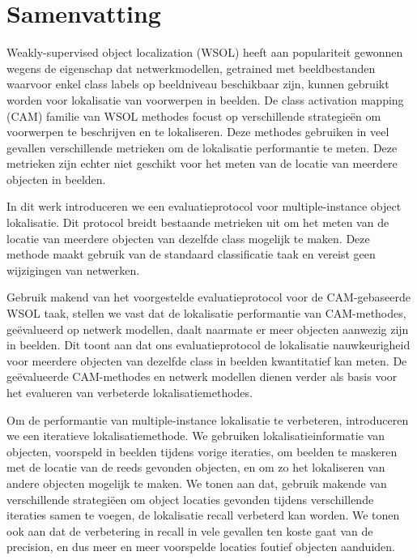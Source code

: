 \chapter*{Samenvatting}

Weakly-supervised object localization (WSOL) heeft aan populariteit gewonnen wegens de eigenschap dat netwerkmodellen, getrained met beeldbestanden waarvoor enkel class labels op beeldniveau beschikbaar zijn, kunnen gebruikt worden voor lokalisatie van voorwerpen in beelden. De class activation mapping (CAM) familie van WSOL methodes focust op verschillende strategieën om voorwerpen te beschrijven en te lokaliseren. Deze methodes gebruiken in veel gevallen verschillende metrieken om de lokalisatie performantie te meten. Deze metrieken zijn echter niet geschikt voor het meten van de locatie van meerdere objecten in beelden.

In dit werk introduceren we een evaluatieprotocol voor multiple-instance object lokalisatie. Dit protocol breidt bestaande metrieken uit om het meten van de locatie van meerdere objecten van dezelfde class mogelijk te maken. Deze methode maakt gebruik van de standaard classificatie taak en vereist geen wijzigingen van netwerken.

Gebruik makend van het voorgestelde evaluatieprotocol voor de CAM-gebaseerde WSOL taak, stellen we vast dat de lokalisatie performantie van CAM-methodes, geëvalueerd op netwerk modellen, daalt naarmate er meer objecten aanwezig zijn in beelden. Dit toont aan dat ons evaluatieprotocol de lokalisatie nauwkeurigheid voor meerdere objecten van dezelfde class in beelden kwantitatief kan meten. De geëvalueerde CAM-methodes en netwerk modellen dienen verder als basis voor het evalueren van verbeterde lokalisatiemethodes.

Om de performantie van multiple-instance lokalisatie te verbeteren, introduceren we een iteratieve lokalisatiemethode. We gebruiken lokalisatieinformatie van objecten, voorspeld in beelden tijdens vorige iteraties, om beelden te maskeren met de locatie van de reeds gevonden objecten, en om zo het lokaliseren van andere objecten mogelijk te maken. We tonen aan dat, gebruik makende van verschillende strategiëen om object locaties gevonden tijdens verschillende iteraties samen te voegen, de lokalisatie recall verbeterd kan worden. We tonen ook aan dat de verbetering in recall in vele gevallen ten koste gaat van de precision, en dus meer en meer voorspelde locaties foutief objecten aanduiden.